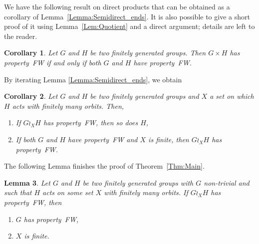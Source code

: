\documentclass[a4paper]{article}
\newtheorem{lem}{Lemma}[section]
\newtheorem{cor}[lem]{Corollary}
\theoremstyle{definition}
\theoremstyle{remark}
\begin{document}
%
%
We have the following result on direct products that can be obtained as a corollary of Lemma~\ref{Lemma:Semidirect_ends}. It is also possible to give a short proof of it using Lemma~\ref{Lem:Quotient} and a direct argument; details are left to the reader.
\begin{cor}
Let $G$ and $H$ be two finitely generated groups. Then $G\times H$ has property~FW if and only if both $G$ and $H$ have property~FW.
\end{cor}
%
%
By iterating Lemma \ref{Lemma:Semidirect_ends}, we obtain
%
%
\begin{cor}\label{Cor:Wreath_ends}
Let $G$ and $H$ be two finitely generated groups and $X$ a set on which $H$ acts with finitely many orbits. Then,
\begin{enumerate}
\item
If $G\wr_X H$ has property~FW, then so does $H$,
\item
If both $G$ and $H$ have property~FW and $X$ is finite, then $G\wr_X H$ has property~FW.
\end{enumerate}
\end{cor}
%
%
The following Lemma finishes the proof of Theorem~\ref{Thm:Main}.
%
%
\begin{lem}\label{Lem:Wreath_groups_ends}
Let $G$ and $H$ be two finitely generated groups with $G$ non-trivial and such that $H$ acts on some set $X$ with finitely many orbits.
If $G\wr_XH$ has property~FW, then
\begin{enumerate}
\item $G$ has property~FW,
\item $X$ is finite.
\end{enumerate}
\end{lem}
%
%
\end{document}
